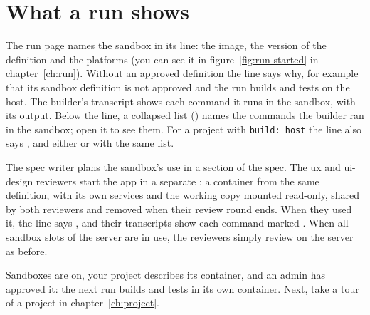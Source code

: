 

\section{What a run shows}\label{sec:sandbox-run}

The run page names the sandbox in its  line: the image, the version of the
definition and the platforms (you can see it in figure~\ref{fig:run-started} in
chapter~\ref{ch:run}). Without an approved definition the line says why, for example that its
sandbox definition is not approved and the run builds and tests on the host. The builder's
transcript shows each command it runs in the sandbox, with its output. Below the line, a collapsed
list () names the commands the builder ran in the sandbox; open it to see
them. For a project with \texttt{build: host} the line also says , and either
 or  with the same list.

The spec writer plans the sandbox's use in a  section of the spec. The ux and
ui-design reviewers start the app in a separate : a container from the same
definition, with its own services and the working copy mounted read-only, shared by both reviewers
and removed when their review round ends. When they used it, the  line says
, and their transcripts show each command marked . When all
sandbox slots of the server are in use, the reviewers simply review on the server as before.

\whatyouhave
Sandboxes are on, your project describes its container, and an admin has approved it: the next
run builds and tests in its own container. Next, take a tour of a project in
chapter~\ref{ch:project}.
